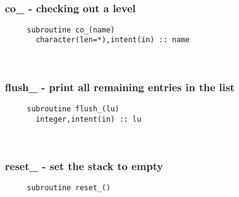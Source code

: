  
\mbox{}\hrulefill\ 

  \subsubsection{co\_ - checking out a level}

\begin{verbatim} 
     subroutine co_(name)
       character(len=*),intent(in) :: name
 \end{verbatim}%
 
 
\mbox{}\hrulefill\ 
 
  \subsubsection{flush\_ - print all remaining entries in the list}

\begin{verbatim} 
     subroutine flush_(lu)
       integer,intent(in) :: lu
 \end{verbatim}%
 
 
\mbox{}\hrulefill\ 
 
\subsubsection{reset\_ - set the stack to empty}

\begin{verbatim} 
     subroutine reset_()
 \end{verbatim}%


